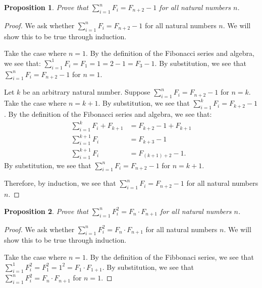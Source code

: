 \documentclass{amsart}
\newtheorem*{proposition}{Proposition}
\numberwithin{equation}{section}
\begin{document}
	\begin{problem}[manual-num=62]
		\begin{proposition}
			Prove that $\sum_{i = 1}^{n} F_i = F_{n + 2} - 1$ for all natural numbers $n$.
		\end{proposition}

		\begin{proof}
			We ask whether $\sum_{i = 1}^{n} F_i = F_{n + 2} - 1$ for all natural numbers $n$.
			We will show this to be true through induction.

			Take the case where $n = 1$.
			By the definition of the Fibonacci series and algebra, we see that:
			$\sum_{i = 1}^{1} F_i = F_1 = 1 = 2 - 1 = F_3 - 1$.
			By substitution, we see that $\sum_{i = 1}^{n} F_i = F_{n + 2} - 1$ for $n = 1$.

			Let $k$ be an arbitrary natural number. Suppose $\sum_{i = 1}^{n} F_i = F_{n + 2} - 1$ for $n = k$.
			Take the case where $n = k + 1$.
			By substitution, we see that $\sum_{i = 1}^{k} F_i = F_{k + 2} - 1$.
			By the definition of the Fibonacci series and algebra, we see that:
			\begin{align*}
				\sum_{i = 1}^{k} F_i + F_{k + 1} &= F_{k + 2} - 1 + F_{k + 1} \\
				\sum_{i = 1}^{k + 1} F_i &= F_{k + 3} - 1 \\
				\sum_{i = 1}^{k + 1} F_i &= F_{(k + 1) + 2} - 1.
			\end{align*}
			By substitution, we see that $\sum_{i = 1}^{n} F_i = F_{n + 2} - 1$ for $n = k + 1$.

			Therefore, by induction, we see that $\sum_{i = 1}^{n} F_i = F_{n + 2} - 1$ for all natural numbers $n$.
		\end{proof}

		\begin{proposition}
			Prove that $\sum_{i = 1}^{n} F_i^2 = F_n \cdot F_{n + 1}$ for all natural numbers $n$.
		\end{proposition}

		\begin{proof}
			We ask whether $\sum_{i = 1}^{n} F_i^2 = F_n \cdot F_{n + 1}$ for all natural numbers $n$.
			We will show this to be true through induction.

			Take the case where $n = 1$.
			By the definition of the Fibbonaci series, we see that $\sum_{i = 1}^{1} F_i^2 = F_1^2 = 1^2 = F_1 \cdot F_{1 + 1}$.
			By substitution, we see that $\sum_{i = 1}^{n} F_i^2 = F_n \cdot F_{n + 1}$ for $n = 1$.


\end{proof}
\end{problem}
\end{document}
